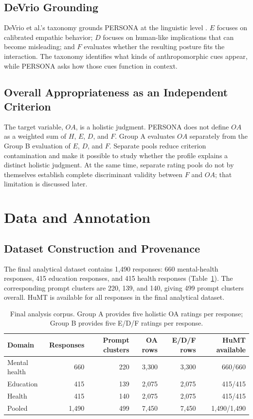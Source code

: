 \documentclass[manuscript,review,anonymous]{acmart}
\begin{document}
\subsection{DeVrio Grounding}

DeVrio et al.'s taxonomy grounds PERSONA at the linguistic level \cite{devrio2025}. $E$ focuses on calibrated empathic behavior; $D$ focuses on human-like implications that can become misleading; and $F$ evaluates whether the resulting posture fits the interaction. The taxonomy identifies what kinds of anthropomorphic cues appear, while PERSONA asks how those cues function in context.

\subsection{Overall Appropriateness as an Independent Criterion}

The target variable, $OA$, is a holistic judgment. PERSONA does not define $OA$ as a weighted sum of $H$, $E$, $D$, and $F$. Group A evaluates $OA$ separately from the Group B evaluation of $E$, $D$, and $F$. Separate pools reduce criterion contamination and make it possible to study whether the profile explains a distinct holistic judgment. At the same time, separate rating pools do not by themselves establish complete discriminant validity between $F$ and $OA$; that limitation is discussed later.

\section{Data and Annotation}

\subsection{Dataset Construction and Provenance}

The final analytical dataset contains 1,490 responses: 660 mental-health responses, 415 education responses, and 415 health responses (Table~\ref{tab:dataset}). The corresponding prompt clusters are 220, 139, and 140, giving 499 prompt clusters overall. HuMT is available for all responses in the final analytical dataset.

\begin{table}[t]
\centering
\caption{Final analysis corpus. Group A provides five holistic OA ratings per response; Group B provides five E/D/F ratings per response.}
\label{tab:dataset}
\begin{tabular}{lrrrrr}
\toprule
Domain & Responses & Prompt clusters & OA rows & E/D/F rows & HuMT available\\
\midrule
Mental health & 660 & 220 & 3,300 & 3,300 & 660/660\\
Education & 415 & 139 & 2,075 & 2,075 & 415/415\\
Health & 415 & 140 & 2,075 & 2,075 & 415/415\\
\midrule
Pooled & 1,490 & 499 & 7,450 & 7,450 & 1,490/1,490\\
\bottomrule
\end{tabular}
\end{table}
\end{document}
